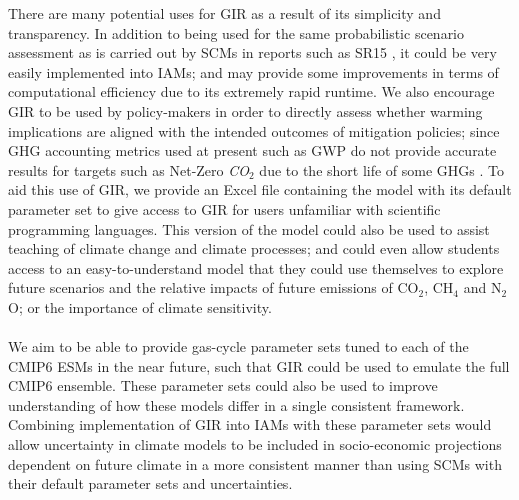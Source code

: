 \documentclass[gmd, manuscript]{copernicus}
\begin{document}
There are many potential uses for GIR as a result of its simplicity and transparency. In addition to being used for the same probabilistic scenario assessment as is carried out by SCMs in reports such as SR15 \citep{IPCC2018}, it could be very easily implemented into IAMs; and may provide some improvements in terms of computational efficiency due to its extremely rapid runtime. We also encourage GIR to be used by policy-makers in order to directly assess whether warming implications are aligned with the intended outcomes of mitigation policies; since GHG accounting metrics used at present such as GWP do not provide accurate results for targets such as Net-Zero \emph{CO$_2$} due to the short life of some GHGs \citep{Allen2018a}. To aid this use of GIR, we provide an Excel file containing the model with its default parameter set to give access to GIR for users unfamiliar with scientific programming languages. This version of the model could also be used to assist teaching of climate change and climate processes; and could even allow students access to an easy-to-understand model that they could use themselves to explore future scenarios and the relative impacts of future emissions of CO$_2$, CH$_4$ and N$_2$O; or the importance of climate sensitivity.\\\\
We aim to be able to provide gas-cycle parameter sets tuned to each of the CMIP6 ESMs in the near future, such that GIR could be used to emulate the full CMIP6 ensemble. These parameter sets could also be used to improve understanding of how these models differ in a single consistent framework. Combining implementation of GIR into IAMs with these parameter sets would allow uncertainty in climate models to be included in socio-economic projections dependent on future climate in a more consistent manner than using SCMs with their default parameter sets and uncertainties.







\end{document}
